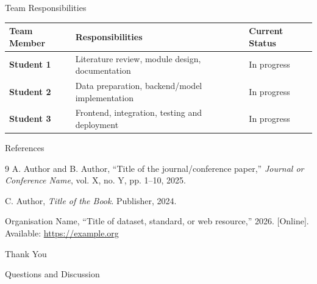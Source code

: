 \documentclass[aspectratio=169,11pt]{beamer}
\begin{document}
\begin{frame}{Team Responsibilities}
  \small
  \begin{tabularx}{\textwidth}{>{\bfseries}p{3.3cm}X p{2.3cm}}
    \toprule
    Team Member & Responsibilities & Current Status \\
    \midrule
    Student 1 & Literature review, module design, documentation & In progress \\
    Student 2 & Data preparation, backend/model implementation & In progress \\
    Student 3 & Frontend, integration, testing and deployment & In progress \\
    \bottomrule
  \end{tabularx}
\end{frame}

\begin{frame}[allowframebreaks]{References}
  \footnotesize
  \begin{thebibliography}{9}
      A. Author and B. Author,
      ``Title of the journal/conference paper,''
      \emph{Journal or Conference Name}, vol. X, no. Y, pp. 1--10, 2025.

      C. Author,
      \emph{Title of the Book}.
      Publisher, 2024.

      Organisation Name,
      ``Title of dataset, standard, or web resource,'' 2026.
      [Online]. Available: \url{https://example.org}
  \end{thebibliography}
\end{frame}

\begin{frame}[plain]
  \centering
  \vfill
  {\color{UniversityBlue}\Huge Thank You}\par
  \vspace{0.5cm}
  {\Large Questions and Discussion}\par
  \vspace{0.8cm}
  \vfill
\end{frame}
\end{document}
